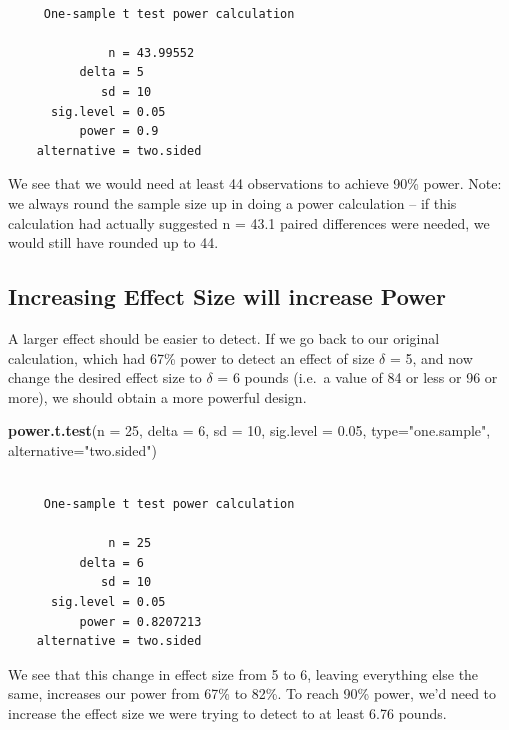 \documentclass[
]{book}
\newenvironment{Shaded}{\begin{snugshade}}{\end{snugshade}}
\newcommand{\DataTypeTok}[1]{\textcolor[rgb]{0.13,0.29,0.53}{#1}}
\newcommand{\DecValTok}[1]{\textcolor[rgb]{0.00,0.00,0.81}{#1}}
\newcommand{\FloatTok}[1]{\textcolor[rgb]{0.00,0.00,0.81}{#1}}
\newcommand{\KeywordTok}[1]{\textcolor[rgb]{0.13,0.29,0.53}{\textbf{#1}}}
\newcommand{\NormalTok}[1]{#1}
\newcommand{\StringTok}[1]{\textcolor[rgb]{0.31,0.60,0.02}{#1}}
\begin{document}
\begin{verbatim}

     One-sample t test power calculation 

              n = 43.99552
          delta = 5
             sd = 10
      sig.level = 0.05
          power = 0.9
    alternative = two.sided
\end{verbatim}

We see that we would need at least 44 observations to achieve 90\% power. Note: we always round the sample size up in doing a power calculation -- if this calculation had actually suggested n = 43.1 paired differences were needed, we would still have rounded up to 44.

\hypertarget{increasing-effect-size-will-increase-power}{%
\subsection{Increasing Effect Size will increase Power}\label{increasing-effect-size-will-increase-power}}

A larger effect should be easier to detect. If we go back to our original calculation, which had 67\% power to detect an effect of size \(\delta\) = 5, and now change the desired effect size to \(\delta\) = 6 pounds (i.e.~a value of 84 or less or 96 or more), we should obtain a more powerful design.

\begin{Shaded}
\begin{Highlighting}[]
\KeywordTok{power.t.test}\NormalTok{(}\DataTypeTok{n =} \DecValTok{25}\NormalTok{, }\DataTypeTok{delta =} \DecValTok{6}\NormalTok{, }\DataTypeTok{sd =} \DecValTok{10}\NormalTok{, }\DataTypeTok{sig.level =} \FloatTok{0.05}\NormalTok{, }
             \DataTypeTok{type=}\StringTok{"one.sample"}\NormalTok{, }\DataTypeTok{alternative=}\StringTok{"two.sided"}\NormalTok{)}
\end{Highlighting}
\end{Shaded}

\begin{verbatim}

     One-sample t test power calculation 

              n = 25
          delta = 6
             sd = 10
      sig.level = 0.05
          power = 0.8207213
    alternative = two.sided
\end{verbatim}

We see that this change in effect size from 5 to 6, leaving everything else the same, increases our power from 67\% to 82\%. To reach 90\% power, we'd need to increase the effect size we were trying to detect to at least 6.76 pounds.
\end{document}
